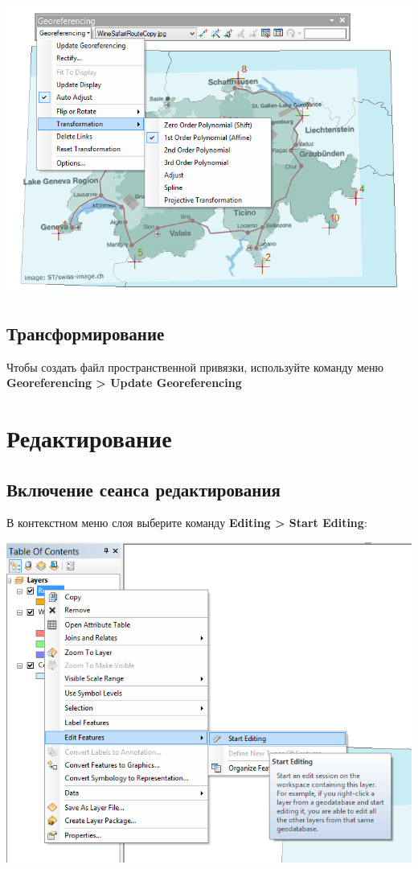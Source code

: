\documentclass[12pt,]{book}
\begin{document}
\includegraphics{images/Appendix/image86.png}

\hypertarget{section-46}{%
\section{Трансформирование}\label{section-46}}

Чтобы создать файл пространственной привязки, используйте команду меню \textbf{Georeferencing \textgreater{} Update Georeferencing}

\hypertarget{manual-edit}{%
\chapter{Редактирование}\label{manual-edit}}

\hypertarget{manual-edit-begin}{%
\section{Включение сеанса редактирования}\label{manual-edit-begin}}

В контекстном меню слоя выберите команду \textbf{Editing \textgreater{} Start Editing}:

\includegraphics{images/Appendix/image87.png}
\end{document}
